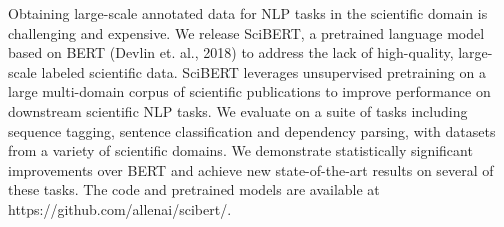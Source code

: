 Obtaining large-scale annotated data for NLP tasks in the scientific domain is challenging and expensive. We release SciBERT, a pretrained language model based on BERT (Devlin et. al., 2018) to address the lack of high-quality, large-scale labeled scientific data. SciBERT leverages unsupervised pretraining on a large multi-domain corpus of scientific publications to improve performance on downstream scientific NLP tasks. We evaluate on a suite of tasks including sequence tagging, sentence classification and dependency parsing, 
with datasets from a variety of scientific domains. We demonstrate statistically significant improvements over BERT and achieve new state-of-the-art results on several of these tasks. The code and pretrained models are available at https://github.com/allenai/scibert/.